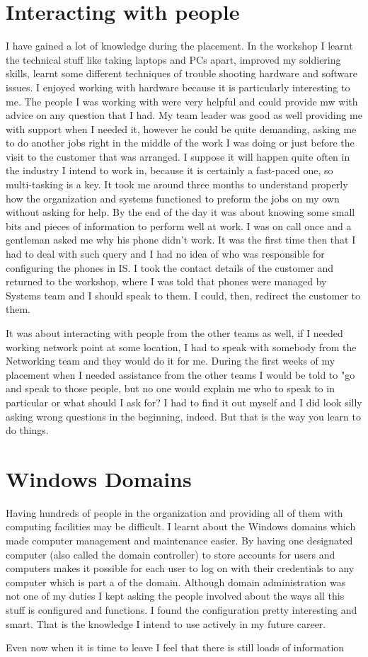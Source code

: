 \documentclass[10pt,a4paper,headinclude=true]{report}
\begin{document}
\section{Interacting with people}
I have gained a lot of knowledge during the placement. In the workshop I learnt the technical stuff like taking laptops and PCs apart, improved my soldiering skills, learnt some different techniques of trouble shooting hardware and software issues. I enjoyed working with hardware because it is particularly interesting to me. The people I was working with were very helpful and could provide mw with advice on any question that I had. My team leader was good as well providing me with support when I needed it, however he could be quite demanding, asking me to do another jobs right in the middle of the work I was doing or just before the visit to the customer that was arranged. I suppose it will happen quite often in the industry I intend to work in, because it is certainly a fast-paced one, so multi-tasking is a key. It took me around three months to understand properly how the organization and systems functioned to preform the jobs on my own without asking for help. By the end of the day it was about knowing some small bits and pieces of information to perform well at work. I was on call once and a gentleman asked me why his phone didn't work. It was the first time then that I had to deal with such query and I had no idea of who was responsible for configuring the phones in IS. I took the contact details of the customer and returned to the workshop, where I was told that phones were managed by Systems team and I should speak to them. I could, then, redirect the customer to them.

It was about interacting with people from the other teams as well, if I needed working network point at some location, I had to speak with somebody from the Networking team and they would do it for me. During the first weeks of my placement when I needed assistance from the other teams I would be told to "go and speak to those people, but no one would explain me who to speak to in particular or what should I ask for? I had to find it out myself and I did look silly asking wrong questions in the beginning, indeed. But that is the way you learn to do things.

\section{Windows Domains}
Having hundreds of people in the organization and providing all of them with computing facilities may be difficult. I learnt about the Windows domains which made computer management and maintenance easier. By having one designated computer (also called the domain controller) to store accounts for users and computers makes it possible for each user to log on with their credentials to any computer which is part a of the domain. Although domain administration was not one of my duties I kept asking the people involved about the ways all this stuff is configured and functions. I found the configuration pretty interesting and smart. That is the knowledge I intend to use actively in my future career.

Even now when it is time to leave I feel that there is still loads of information 



\end{document}
